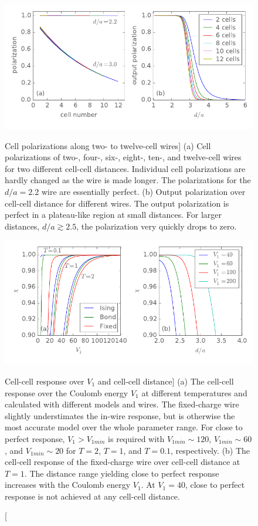 \begin{figure}
  \center
  \includegraphics{wire_polarization}
  \caption
  [Cell polarizations along two- to twelve-cell wires]
  {
  (a) Cell polarizations of two-, four-, six-, eight-, ten-, and twelve-cell
  wires for two different cell-cell distances. Individual cell polarizations are
  hardly changed as the wire is made longer. The polarizations for the $d/a =
  2.2$ wire are essentially perfect.
  (b) Output polarization over cell-cell distance for different wires. The
  output polarization is perfect in a plateau-like region at small distances.
  For larger distances, $d/a \gtrsim 2.5$, the polarization very quickly drops
  to zero.
  }
  \label{fig:wire_polarization}

  \vspace*{1cm}
  
  \includegraphics{chis}
  \caption
  [Cell-cell response over $V_1$ and cell-cell distance]
  {
  (a) The cell-cell response over the Coulomb energy $V_1$ at different
  temperatures and calculated with different models and wires. The fixed-charge
  wire slightly understimates the in-wire response, but is otherwise the most
  accurate model over the whole parameter range. For close to perfect response,
  $V_1 > V_{1min}$ is required with $V_{1min} \sim 120$, $V_{1min} \sim 60$, and
  $V_{1min} \sim 20$ for $T = 2$, $T = 1$, and $T = 0.1$, respectively.
  (b) The cell-cell response of the fixed-charge wire over cell-cell distance at
  $T = 1$. The distance range yielding close to perfect response increases with
  the Coulomb energy $V_1$. At $V_1 = 40$, close to perfect response is not
  achieved at any cell-cell distance.
  }
  \label{fig:chis}
\end{figure}

